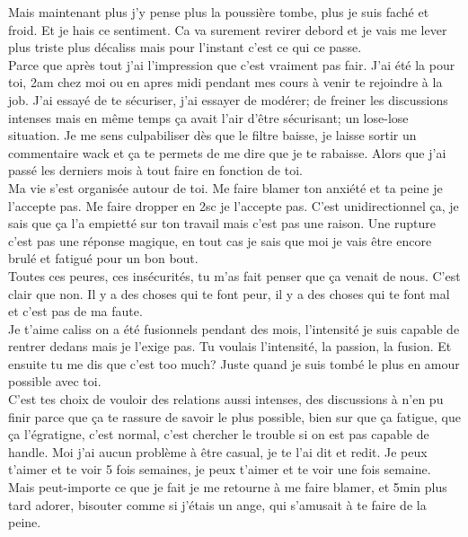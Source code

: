 Mais maintenant plus j'y pense plus la poussière tombe, plus je suis faché
et froid. Et je hais ce sentiment. Ca va surement revirer debord et je vais 
me lever plus triste plus décaliss mais pour l'instant c'est ce qui ce passe.\\

Parce que après tout j'ai l'impression que c'est vraiment pas fair. J'ai été
la pour toi, 2am chez moi ou en apres midi pendant mes cours à venir te rejoindre
à la job. J'ai essayé de te sécuriser, j'ai essayer de modérer; de freiner
les discussions intenses mais en même temps ça avait l'air d'être sécurisant;
un lose-lose situation. Je me sens culpabiliser dès que le filtre
baisse, je laisse sortir un commentaire wack et ça te permets de me 
dire que je te rabaisse. Alors que j'ai passé les derniers mois à tout
faire en fonction de toi. \\

Ma vie s'est organisée autour de toi. Me faire blamer ton anxiété et
ta peine je l'accepte pas. Me faire dropper en 2sc je l'accepte pas. 
C'est unidirectionnel ça, je sais que ça l'a empietté sur ton travail
mais c'est pas une raison. Une rupture c'est pas une réponse magique,
en tout cas je sais que moi je vais être encore brulé et fatigué pour 
un bon bout.\\

Toutes ces peures, ces insécurités, tu m'as fait penser que ça venait
de nous. C'est clair que non. Il y a des choses qui te font peur, il 
y a des choses qui te font mal et c'est pas de ma faute.\\

Je t'aime caliss on a été fusionnels pendant des mois,
l'intensité je suis capable de rentrer dedans mais je l'exige pas.
Tu voulais l'intensité, la passion, la fusion.
Et ensuite tu me dis que c'est too much? Juste quand je suis 
tombé le plus en amour possible avec toi.\\


C'est tes choix de vouloir des relations aussi intenses, des discussions
à n'en pu finir parce que ça te rassure de savoir le plus possible,
bien sur que ça fatigue, que ça l'égratigne, c'est normal, c'est chercher
le trouble si on est pas capable de handle. Moi j'ai aucun problème
à être casual, je te l'ai dit et redit. Je peux t'aimer et te voir 5 fois
semaines, je peux t'aimer et te voir une fois semaine. Mais peut-importe
ce que je fait je me retourne à me faire blamer, et 5min plus tard
adorer, bisouter comme si j'étais un ange, qui s'amusait à te faire 
de la peine.\\


